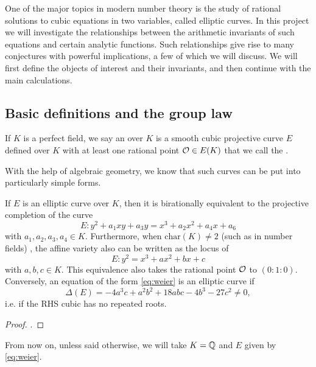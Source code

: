 \documentclass[12pt, a4paper]{amsart}
\begin{document}
One of the major topics in modern number theory is the study of rational
solutions to cubic equations in two variables, called elliptic curves.
In this project we will
investigate the relationships between the arithmetic invariants of such
equations and certain analytic functions. Such relationships give rise to
many conjectures with powerful implications, a few of which we will discuss.
We will first define the objects of interest and their invariants, and then
continue with the main calculations.

\subsection{Basic definitions and the group law}

\begin{defn}
  If $K$ is a perfect field,
  we say an  over $K$ is a smooth cubic projective
  curve $E$ defined over $K$ with at least one rational point ${\mathcal O} \in E(K)$
  that we call the .
\end{defn}
With the help of algebraic geometry, we know that such curves can be put
into particularly simple forms.

\begin{prop}
  If $E$ is an elliptic curve over $K$, then it is birationally equivalent
  to the projective completion of the curve
  \begin{equation} \label{eq:weier2}
    E: y^2 + a_1xy + a_3y = x^3 + a_2x^2 + a_4x + a_6
  \end{equation}
  with $a_1, a_2, a_3, a_4 \in K.$
  Furthermore, when $\text{char}(K) \neq 2$ (such as in number fields)
  , the affine variety also can be written as the locus of
  \begin{equation} \label{eq:weier}
    E: y^2 = x^3 + ax^2 + bx + c
  \end{equation}
  with $a, b, c\in K$. This equivalence also takes the rational point ${\mathcal O}$ to
  $(0 : 1 : 0)$.
  Conversely, an equation of the form \ref{eq:weier} is an elliptic curve if
  \[\Delta(E) = -4a^3c + a^2b^2 + 18abc - 4b^3 - 27c^2 \neq 0,\]
  i.e. if the RHS cubic has no repeated roots.
\end{prop}

\begin{proof}
  \cite[See][Chapter III, pages 42-43]{arithmetic}.
\end{proof}

From now on, unless said otherwise, we will take $K = {\mathbb Q}$ and $E$ given
by \autoref{eq:weier}.
\end{document}
